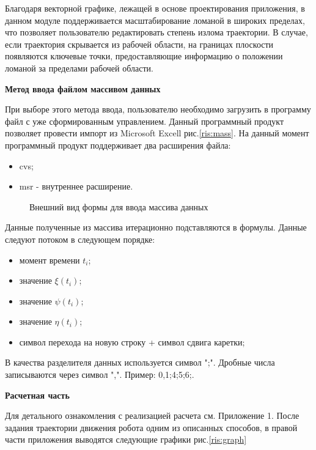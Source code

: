 Благодаря векторной графике, лежащей в основе проектирования приложения, в данном модуле поддерживается масштабирование ломаной в широких пределах, что  позволяет пользователю редактировать степень излома траектории. В случае, если траектория скрывается из рабочей области, на границах плоскости появляются ключевые точки, предоставляющие информацию о положении ломаной за пределами рабочей области.
\par
\textbf{Метод ввода файлом массивом данных}

При выборе этого метода ввода, пользователю необходимо загрузить в программу файл с уже сформированным управлением. Данный программный продукт позволяет провести импорт из Microsoft Excell рис.\eqref{ris:mass}. На данный момент программный продукт поддерживает два расширения файла: 

\begin{itemize}
\item{cvs;}
\item{msr - внутреннее расширение.}
\end{itemize}

\begin{figure}[h]
\caption{Внешний вид формы для ввода массива данных}
\label{ris:mass}
\end{figure}

Данные полученные из массива итерационно подставляются в формулы. Данные следуют потоком в следующем порядке:
\begin{itemize}
\item{момент времени  $t_i$;}
\item{значение  $\xi(t_i)$;}
\item{значение  $\psi(t_i)$;}
\item{значение  $\eta(t_i)$;}
\item{символ перехода на новую строку + символ сдвига каретки;}
\end{itemize}

В качества разделителя данных используется символ ";". Дробные числа записываются через символ ",".
Пример:   0,1;4;5;6;.
\par
\textbf{Расчетная часть}

Для детального ознакомления с реализацией расчета см. Приложение 1.
После задания траектории движения робота одним из описанных способов, в правой части приложения выводятся следующие графики рис.\eqref{ris:graph}

